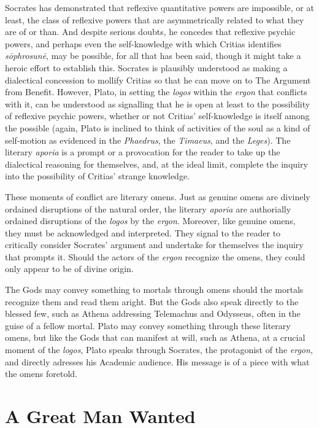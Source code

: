 Socrates has demonstrated that reflexive quantitative powers are impossible, or at least, the class of reflexive powers that are asymmetrically related to what they are of or than. And despite serious doubts, he concedes that reflexive psychic powers, and perhaps even the self-knowledge with which Critias identifies \emph{sōphrosunē}, may be possible, for all that has been said, though it might take a heroic effort to establish this. Socrates is plausibly understood as making a dialectical concession to mollify Critias so that he can move on to The Argument from Benefit. However, Plato, in setting the \emph{logos} within the \emph{ergon} that conflicts with it, can be understood as signalling that he is open at least to the possibility of reflexive psychic powers, whether or not Critias' self-knowledge is itself among the possible (again, Plato is inclined to think of activities of the soul as a kind of self-motion as evidenced in the \emph{Phaedrus}, the \emph{Timaeus}, and the \emph{Leges}). The literary \emph{aporia} is a prompt or a provocation for the reader to take up the dialectical reasoning for themselves, and, at the ideal limit, complete the inquiry into the possibility of Critias' strange knowledge. 

These moments of conflict are literary omens. Just as genuine omens are divinely ordained disruptions of the natural order, the literary \emph{aporia} are authorially ordained disruptions of the \emph{logos} by the \emph{ergon}. Moreover, like genuine omens, they must be acknowledged and interpreted. They signal to the reader to critically consider Socrates' argument and undertake for themselves the inquiry that prompts it. Should the actors of the \emph{ergon} recognize the omens, they could only appear to be of divine origin. 

The Gods may convey something to mortals through omens should the mortals recognize them and read them aright. But the Gods also speak directly to the blessed few, such as Athena addressing Telemachus and Odysseus, often in the guise of a fellow mortal. Plato may convey something through these literary omens, but like the Gods that can manifest at will, such as Athena, at a crucial moment of the \emph{logos}, Plato speaks through Socrates, the protagonist of the \emph{ergon}, and directly adresses his Academic audience. His message is of a piece with what the omens foretold.


\section{A Great Man Wanted} %
\label{sec:a_great_man_wanted}

